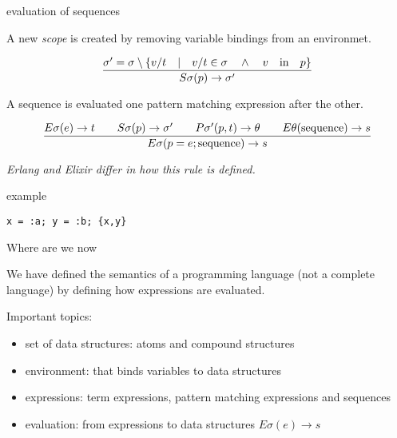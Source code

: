 \begin{frame}{evaluation of sequences}

  \pause  A new {\em scope} is created by removing variable bindings from an environmet.

  \vspace{10pt}\pause

$$\frac{\sigma' = \sigma \setminus \lbrace v/t \quad | \quad v/t \in \sigma \quad \wedge \quad  v \quad {\rm in} \quad p\rbrace}{S\sigma(p) \rightarrow \sigma'}$$
  
\vspace{10pt}\pause

A sequence is evaluated one pattern matching expression after the other. 

$$\frac{   
  E\sigma(e) \rightarrow t
  \qquad S\sigma(p) \rightarrow \sigma' 
  \qquad P\sigma'(p, t) \rightarrow \theta
  \qquad E\theta({\rm sequence}) \rightarrow s
}{E\sigma(p = e; {\rm sequence}) \rightarrow s}$$ 

\vfill
{\em Erlang and Elixir differ in how this rule is defined.}
\end{frame}

\begin{frame}{example}

   {\tt x = :a; y = :b; \{x,y\}}

\end{frame}

\begin{frame}{Where are we now}

We have defined the semantics of a programming language (not a
complete language) by defining how expressions are evaluated.

\vspace{20pt} 

\pause Important topics:

\vspace{10pt} 

\begin{itemize}
 \pause \item set of data structures: atoms and compound structures
 \pause \item environment: that binds variables to data structures
 \pause \item expressions: term expressions, pattern matching expressions and sequences
 \pause \item evaluation: from expressions to data structures $E\sigma(e) \rightarrow s$
\end{itemize}

\end{frame}

